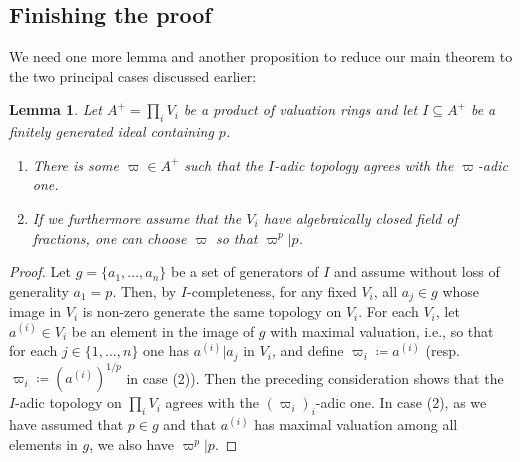 \documentclass[10pt,twoside]{article}
\numberwithin{equation}{section}
\theoremstyle{plain}
\newtheorem{mylemma}[mythm]{Lemma}
\theoremstyle{definition}
\begin{document}
\subsection{Finishing the proof}
\label{secFinishing}

We need one more lemma and another proposition to reduce our main theorem to the two principal cases discussed earlier:


\begin{mylemma}\label{IisVarpi}
    Let \(A^+=\prod_i V_i\) be a product of valuation rings and let \(I\subseteq A^+\) be a finitely generated ideal containing \(p\). 
    
    \begin{enumerate}
        \item There is some \(\varpi\in A^+\) such that the \(I\)-adic topology agrees with the \(\varpi\)-adic one. 
        \item If we furthermore assume that the \(V_i\) have algebraically closed field of fractions, one can choose \(\varpi\) so that \(\varpi^p|p\).
    \end{enumerate}
\end{mylemma}

\begin{proof}
    Let \(g=\{a_1,\dots,a_n\}\) be a set of generators of \(I\) and assume without loss of generality \(a_1=p\). Then, by \(I\)-completeness, for any fixed \(V_i\), all \(a_j\in g\) whose image in \(V_i\) is non-zero generate the same topology on \(V_i\). For each \(V_i\), let \(a^{(i)}\in V_i\) be an element in the image of \(g\) with maximal valuation, i.e., so that for each \(j\in \{1,\dots,n\}\) one has \(a^{(i)}|a_j\) in \(V_i\), and define \(\varpi_i\coloneqq a^{(i)}\) (resp. \(\varpi_i\coloneqq(a^{(i)})^{1/p}\) in case (2)). Then the preceding consideration shows that the \(I\)-adic topology on \(\prod_i V_i\) agrees with the \((\varpi_i)_i\)-adic one. In case (2), as we have assumed that \(p\in g\) and that \(a^{(i)}\) has maximal valuation among all elements in \(g\), we also have \(\varpi^p|p\).
\end{proof}
\end{document}
